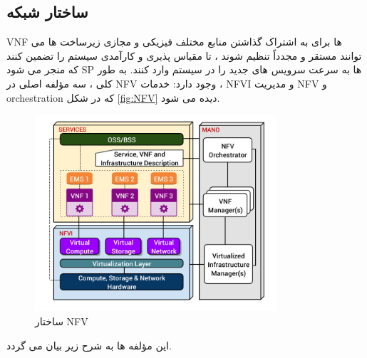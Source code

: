  \subsection{ساختار شبکه }
 VNF
 ها برای به اشتراک گذاشتن منابع مختلف فیزیکی و مجازی زیرساخت ها می توانند مستقر و مجدداً تنظیم شوند ، تا مقیاس پذیری و کارآمدی سیستم را تضمین کنند که منجر می شود SP ها به سرعت سرویس های جدید را در سیستم وارد کنند.
 به طور کلی ، سه مؤلفه اصلی در NFV وجود دارد:
 خدمات ، NFVI و مدیریت NFV و orchestration
 که در شکل \eqref{fig:NFV} دیده می شود.
 \begin{figure}
  \centering
    \includegraphics[width=0.8\textwidth]{./fig/NFV}
  \caption{ساختار NFV \cite{NFVArch}}
  \label{fig:NFV}
\end{figure} 
این مؤلفه ها به شرح زیر بیان می گردد\cite{NFVArch}.
